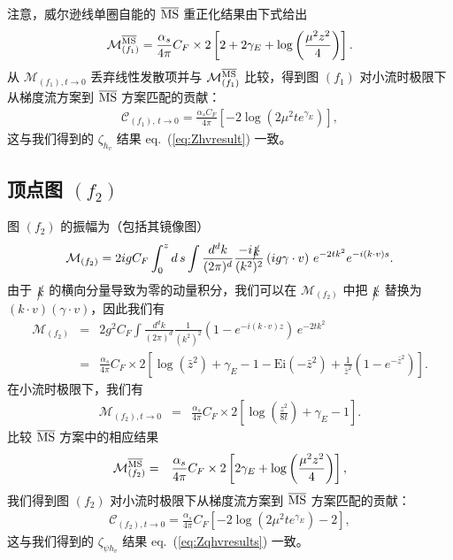 注意，威尔逊线单圈自能的 $\overline{\rm MS}$ 重正化结果由下式给出 \cite{Izubuchi:2018srq}
\begin{eqnarray}
\mathcal{M}_{(f_1)}^{\overline{\rm MS}} = \frac{\alpha_s}{4\pi}C_F\times 2 \left[2 + 2\gamma_E+ \log\left(\frac{\mu^2z^2}{4}\right)\right].
\end{eqnarray}
从 $\mathcal{M}_{(f_1), t\rightarrow 0}$ 丢弃线性发散项并与 $\mathcal{M}_{(f_1)}^{\overline{\rm MS}}$ 比较，得到图 $(f_1)$ 对小流时极限下从梯度流方案到 $\overline{\rm MS}$ 方案匹配的贡献：
\begin{eqnarray}
\label{eq:WilsonselfGF2MS}
\mathcal{C}_{(f_1),\, t \rightarrow 0} =  \frac{\alpha_sC_F}{4\pi}\left[-2\log\left(2\mu^2te^{\gamma_E}\right)\right],
\end{eqnarray}
这与我们得到的 $\zeta_{h_v}$ 结果 eq.~(\ref{eq:Zhvresult}) 一致。

\subsection{顶点图 $(f_2)$}
图 $(f_2)$ 的振幅为（包括其镜像图）
\begin{eqnarray}
\mathcal{M}_{(f_2)} =2igC_F \int_0^z d\, s\int \frac{d^d k}{(2\pi)^d} \frac{-i\slashed{k}}{(k^2)^2} \left(ig\gamma\cdot v\right)\, e^{-2t k^2} e^{-i(k\cdot v)s}.
\end{eqnarray}
由于 $\slashed{k}$ 的横向分量导致为零的动量积分，我们可以在 $\mathcal{M}_{(f_2)}$ 中把 $\slashed{k}$ 替换为 $(k\cdot v)(\gamma\cdot v)$，因此我们有
\begin{eqnarray}
\label{eq:resultsdiagramd}
\mathcal{M}_{(f_2)} &=& 2g^2C_F \int \frac{d^d k}{(2\pi)^d} \frac{1}{(k^2)^2} \left(1-e^{-i(k\cdot v) z}\right)\, e^{-2t k^2} \nonumber\\
&=& \frac{\alpha_s}{4\pi}C_F\times 2\left[\log\left(\bar{z}^2\right) + \gamma_E - 1 -\text{Ei}\left(-\bar{z}^2\right) + \frac{1}{\bar{z}^2}\left(1-e^{-\bar{z}^2}\right)\right].
\end{eqnarray}
在小流时极限下，我们有
\begin{eqnarray}
\mathcal{M}_{(f_2), t\rightarrow 0} &=&\frac{\alpha_s}{4\pi}C_F\times 2\left[\log\left(\frac{z^2}{8t}\right) + \gamma_E - 1 \right].
\end{eqnarray}
比较 $\overline{\rm MS}$ 方案中的相应结果 \cite{Izubuchi:2018srq}
\begin{eqnarray}
\mathcal{M}_{(f_2)}^{\overline{\rm MS}} &=&\frac{\alpha_s}{4\pi}C_F\times 2\left[2\gamma_E  +\log\left(\frac{\mu^2z^2}{4}\right) \right],
\end{eqnarray}
我们得到图 $(f_2)$ 对小流时极限下从梯度流方案到 $\overline{\rm MS}$ 方案匹配的贡献：
\begin{eqnarray}
\label{eq:quarkvertexGF2MS}
\mathcal{C}_{(f_2), t\rightarrow 0} = \frac{\alpha_s}{4\pi}C_F\left[-2\log\left(2\mu^2te^{\gamma_E}\right)  -2 \right],
\end{eqnarray}
这与我们得到的 $\zeta_{\psi h_v}$ 结果 eq.~(\ref{eq:Zqhvresults}) 一致。

